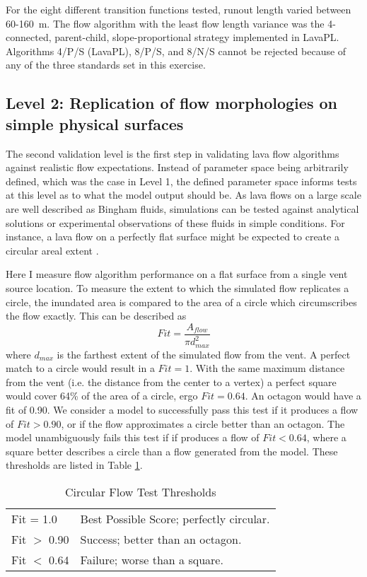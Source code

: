 			For the eight different transition functions tested, runout length varied between 60-160~m. The flow algorithm with the least flow length variance was the 4-connected, parent-child, slope-proportional strategy implemented in LavaPL. Algorithms 4/P/S (LavaPL), 8/P/S, and 8/N/S cannot be rejected because of any of the three standards set in this exercise.

	\subsection{Level 2: Replication of flow morphologies on simple physical surfaces}
	
	The second validation level is the first step in validating lava flow algorithms against realistic flow expectations. Instead of parameter space being arbitrarily defined, which was the case in Level 1, the defined parameter space informs tests at this level as to what the model output should be. As lava flows on a large scale are well described as Bingham fluids, simulations can be tested against analytical solutions or experimental observations of these fluids in simple conditions. For instance, a lava flow on a perfectly flat surface might be expected to create a circular areal extent \citep{griffiths2000dynamics}.
	
			Here I measure flow algorithm performance on a flat surface from a single vent source location. To measure the extent to which the simulated flow replicates a circle, the inundated area is compared to the area of a circle which circumscribes the flow exactly. This can be described as
			\begin{equation}
				Fit = \frac{A_{flow}}{\pi d_{max}^2}
			\end{equation}
			where $d_{max}$ is the farthest extent of the simulated flow from the vent. A perfect match to a circle would result in a $Fit=1$. With the same maximum distance from the vent (i.e. the distance from the center to a vertex) a perfect square would cover 64\% of the area of a circle, ergo $Fit=0.64$. An octagon would have a fit of 0.90. We consider a model to successfully pass this test if it produces a flow of $Fit>0.90$, or if the flow approximates a circle better than an octagon. The model unambiguously fails this test if if produces a flow of $Fit<0.64$, where a square better describes a circle than a flow generated from the model. These thresholds are listed in Table \ref{tab_circtest}.

			\begin{table}[h]
				\centering
				\caption{Circular Flow Test Thresholds}
				\begin{tabular}{l l}
					\toprule
					Fit = 1.0 & Best Possible Score; perfectly circular.\\
					Fit $>$ 0.90 & Success; better than an octagon. \\
					Fit $<$ 0.64 & Failure; worse than a square.\\
					\bottomrule
				\end{tabular}
				\label{tab_circtest}
			\end{table}
		
